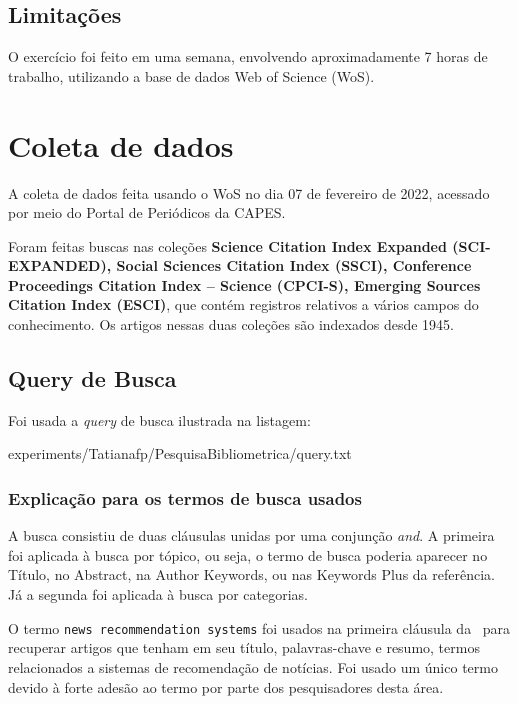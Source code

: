 \subsection{Limitações} 

O exercício foi feito em uma semana, envolvendo aproximadamente 7 horas de trabalho, utilizando a base de dados Web of Science (WoS).

\section{Coleta de dados}

A coleta de dados feita usando o WoS no dia 07 de fevereiro de 2022, acessado por meio do Portal de Periódicos da CAPES.

Foram feitas buscas nas coleções \textbf{Science Citation Index Expanded (SCI-EXPANDED), Social Sciences Citation Index (SSCI), Conference Proceedings Citation Index – Science (CPCI-S), Emerging Sources Citation Index (ESCI)}, que contém registros relativos a vários campos do conhecimento. Os artigos nessas duas coleções são indexados desde 1945. 

\subsection{Query de Busca}

Foi usada a \textit{query} de busca ilustrada na listagem:


{experiments/Tatianafp/PesquisaBibliometrica/query.txt}

\subsubsection{Explicação para os termos de busca usados\label{MASSA:query}}

A busca consistiu de duas cláusulas unidas por uma conjunção \textit{and}. A primeira foi aplicada à busca por tópico, ou seja, o termo de busca poderia aparecer no Título, no Abstract, na Author Keywords, ou nas Keywords Plus da referência. Já a segunda foi aplicada à busca por categorias. 

O termo \texttt{news recommendation systems} foi usados na primeira cláusula da \query\  para recuperar artigos que tenham em seu título, palavras-chave e resumo, termos relacionados a sistemas de recomendação de notícias. Foi usado um único termo devido à forte adesão ao termo por parte dos pesquisadores desta área.

